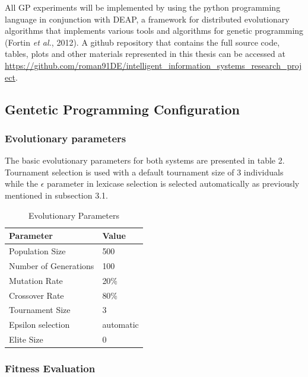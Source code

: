 \documentclass[
  12pt,
]{article}
\begin{document}
All GP experiments will be implemented by using the python programming
language in conjunction with DEAP, a framework for distributed
evolutionary algorithms that implements various tools and algorithms for
genetic programming (Fortin \emph{et al.}, 2012). A github repository
that contains the full source code, tables, plots and other materials
represented in this thesis can be accessed at
\protect\hyperlink{https:ux2fux2fgithub.comux2froman91DEux2fintelligent_information_systems_research_project}{https://github.com/roman91DE/intelligent\_information\_systems\_research\_project}.

\hypertarget{gentetic-programming-configuration}{%
\subsection{Gentetic Programming
Configuration}\label{gentetic-programming-configuration}}

\hypertarget{evolutionary-parameters}{%
\subsubsection{Evolutionary parameters}\label{evolutionary-parameters}}

The basic evolutionary parameters for both systems are presented in
table 2. Tournament selection is used with a default tournament size of
\(3\) individuals while the \(\epsilon\) parameter in lexicase selection
is selected automatically as previously mentioned in subsection 3.1.

\begin{table}[!h]

\caption{\label{tab:unnamed-chunk-2}Evolutionary Parameters}
\centering
\begin{tabular}[t]{l|l}
\hline
\textbf{Parameter} & \textbf{Value}\\
\hline
Population Size & 500\\
\hline
Number of Generations & 100\\
\hline
Mutation Rate & 20\%\\
\hline
Crossover Rate & 80\%\\
\hline
Tournament Size & 3\\
\hline
Epsilon selection & automatic\\
\hline
Elite Size & 0\\
\hline
\end{tabular}
\end{table}

\hypertarget{fitness-evaluation}{%
\subsubsection{Fitness Evaluation}\label{fitness-evaluation}}
\end{document}
